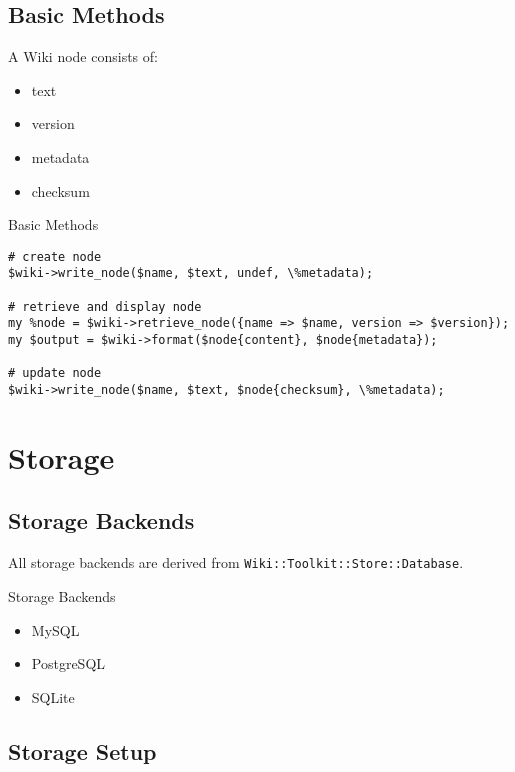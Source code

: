 \subsection{Basic Methods}

A Wiki node consists of:

\begin{itemize}
  \item text
  \item version
  \item metadata
  \item checksum
\end{itemize}


\begin{frame}[fragile]{Basic Methods}
\begin{lstlisting}
# create node
$wiki->write_node($name, $text, undef, \%metadata);

# retrieve and display node
my %node = $wiki->retrieve_node({name => $name, version => $version});
my $output = $wiki->format($node{content}, $node{metadata});
 
# update node
$wiki->write_node($name, $text, $node{checksum}, \%metadata);
\end{lstlisting}
\end{frame}

\section{Storage}

\subsection{Storage Backends}

All storage backends are derived from \verb+Wiki::Toolkit::Store::Database+.

\begin{frame}{Storage Backends}
 \begin{itemize}
  \item MySQL
  \item PostgreSQL
  \item SQLite
 \end{itemize}
\end{frame}

\subsection{Storage Setup}

